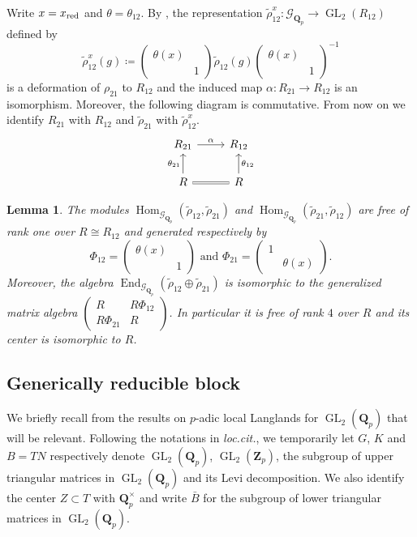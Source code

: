 \documentclass[leqno]{amsart}
\newtheorem{lem}[thm]{Lemma}
\theoremstyle{definition}
\theoremstyle{remark}
\newcommand{\smat}[1]{\left(\begin{smallmatrix} #1 \end{smallmatrix}\right)}
\newcommand{\Qp}{\mathbf{Q}_p}
\newcommand{\Zp}{\mathbf{Z}_p}
\DeclareMathOperator{\End}{End}
\DeclareMathOperator{\Hom}{Hom}
\DeclareMathOperator{\GL}{GL}
\newcommand{\Gp}{\mathcal{G}_{\Qp}} %
\newcommand{\xx}{x_\textnormal{red}}
\begin{document}
Write $x=\xx$ and $\theta=\theta_{12}$.
By \cite[Prop B.24]{pask},
the representation 
$\tilde{\rho}_{12}^x\colon \Gp\to \GL_2(R_{12})$
defined by
\begin{equation*}
	\tilde{\rho}_{12}^x(g)\coloneqq 
	\smat{\theta(x)&\\&1}
	\tilde{\rho}_{12}(g)
	\smat{\theta(x)&\\&1}^{-1}
\end{equation*}
is a deformation of $\rho_{21}$ to $R_{12}$
and the induced map
$\alpha\colon R_{21}\to R_{12}$ is an isomorphism.
Moreover, the following diagram is commutative.
From now on we identify 
$R_{21}$ with $R_{12}$ and
$\tilde{\rho}_{21}$ with 
$\tilde{\rho}_{12}^x$.
\begin{equation*}
	\begin{tikzcd}
		R_{21} \arrow[r,"\alpha"] &
		R_{12}\\
		R\arrow[u,"\theta_{21}"] \arrow[r,equal] &
		R\arrow[u,"\theta_{12}",swap]
	\end{tikzcd}
\end{equation*}

\begin{lem}\cite[Prop B.26]{pask}
\label{lem:B26}
The modules
$\Hom_{\Gp}(\tilde{\rho}_{12}, \tilde{\rho}_{21})$ and
$\Hom_{\Gp}(\tilde{\rho}_{21}, \tilde{\rho}_{12})$
are free of rank one over $R\cong R_{12}$ and
generated respectively by
\begin{equation}\label{eq:Phi_ij}
	\Phi_{12}=\smat{\theta(x)&\\&1} \text{ and }
	\Phi_{21}=\smat{1&\\&\theta(x)}.
\end{equation}
Moreover, the algebra
$\End_{\Gp}(\tilde{\rho}_{12}\oplus \tilde{\rho}_{21})$
is isomorphic to the generalized matrix algebra
$\smat{R& R\Phi_{12}\\ R\Phi_{21}& R}$.
In particular it is free of rank $4$ over $R$ and
its center is isomorphic to $R$.
\end{lem}

\subsection{Generically reducible block}

We briefly recall from \cite{pask} the results on
$p$-adic local Langlands for $\GL_2(\Qp)$ 
that will be relevant.
Following the notations in \textit{loc.cit.},
we temporarily let $G$, $K$ and $B=TN$ respectively
denote $\GL_2(\Qp)$, $\GL_2(\Zp)$,
the subgroup of upper triangular matrices in $\GL_2(\Qp)$
and its Levi decomposition.
We also identify the center $Z\subset T$ with $\Qp^\times$
and write $\bar{B}$ for
the subgroup of lower triangular matrices in $\GL_2(\Qp)$.
\end{document}
